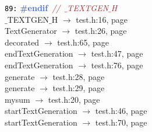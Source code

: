 \documentclass{article}
\begin{document}
\mbox{}\texttt{\textcolor{Black}{89:}} \textbf{\textcolor{RoyalBlue}{\#endif}}\ \textit{\textcolor{Brown}{//\ $\_$TEXTGEN$\_$H}} \\
\mbox{}{\hfill $\_$TEXTGEN$\_$H $\rightarrow$ test.h:16, page~\pageref{test.h:16}} \\
\mbox{}{\hfill TextGenerator $\rightarrow$ test.h:26, page~\pageref{test.h:26}} \\
\mbox{}{\hfill decorated $\rightarrow$ test.h:65, page~\pageref{test.h:65}} \\
\mbox{}{\hfill endTextGeneration $\rightarrow$ test.h:47, page~\pageref{test.h:47}} \\
\mbox{}{\hfill endTextGeneration $\rightarrow$ test.h:76, page~\pageref{test.h:76}} \\
\mbox{}{\hfill generate $\rightarrow$ test.h:28, page~\pageref{test.h:28}} \\
\mbox{}{\hfill generate $\rightarrow$ test.h:29, page~\pageref{test.h:29}} \\
\mbox{}{\hfill mysum $\rightarrow$ test.h:20, page~\pageref{test.h:20}} \\
\mbox{}{\hfill startTextGeneration $\rightarrow$ test.h:46, page~\pageref{test.h:46}} \\
\mbox{}{\hfill startTextGeneration $\rightarrow$ test.h:70, page~\pageref{test.h:70}} \\
\end{document}
